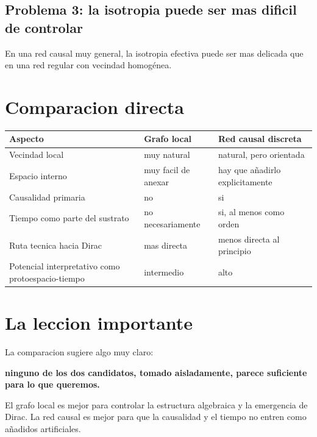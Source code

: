 \subsection{Problema 3: la isotropia puede ser mas dificil de controlar}
En una red causal muy general, la isotropia efectiva puede ser mas delicada que en una red regular con vecindad homogénea.

\section{Comparacion directa}
\begin{center}
\begin{tabular}{@{}p{4.2cm}p{4.5cm}p{4.5cm}@{}}
\toprule
Aspecto & Grafo local & Red causal discreta \\
\midrule
Vecindad local & muy natural & natural, pero orientada \\
Espacio interno & muy facil de anexar & hay que añadirlo explicitamente \\
Causalidad primaria & no & si \\
Tiempo como parte del sustrato & no necesariamente & si, al menos como orden \\
Ruta tecnica hacia Dirac & mas directa & menos directa al principio \\
Potencial interpretativo como protoespacio-tiempo & intermedio & alto \\
\bottomrule
\end{tabular}
\end{center}

\section{La leccion importante}
La comparacion sugiere algo muy claro:
\begin{displayquote}
\textbf{ninguno de los dos candidatos, tomado aisladamente, parece suficiente para lo que queremos.}
\end{displayquote}

El grafo local es mejor para controlar la estructura algebraica y la emergencia de Dirac. La red causal es mejor para que la causalidad y el tiempo no entren como añadidos artificiales.

